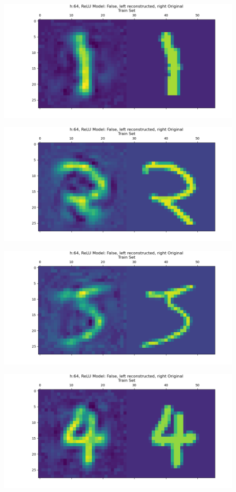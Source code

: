 \documentclass[]{article}
\begin{document}
        \begin{center}
            \includegraphics*[width=12cm]{A4plots/06-43-18-h-64-lin-digit-1.png}
        \end{center}
        \begin{center}
            \includegraphics*[width=12cm]{A4plots/06-43-18-h-64-lin-digit-2.png}
        \end{center}
        \begin{center}
            \includegraphics*[width=12cm]{A4plots/06-43-18-h-64-lin-digit-3.png}
        \end{center}
        \begin{center}
            \includegraphics*[width=12cm]{A4plots/06-43-18-h-64-lin-digit-4.png}
        \end{center}
\end{document}

